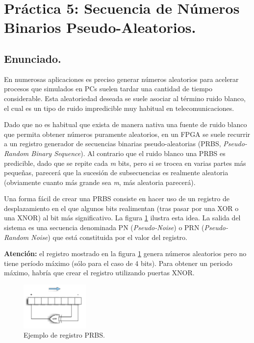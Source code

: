 \documentclass{article}
\begin{document}
\clearpage

\section{Práctica 5: Secuencia de Números Binarios Pseudo-Aleatorios.}

\subsection{Enunciado.}

En numerosas aplicaciones es preciso generar números aleatorios para acelerar procesos que simulados en PCs suelen tardar una cantidad de tiempo considerable. Esta aleatoriedad deseada se suele asociar al término ruido blanco, el cual es un tipo de ruido impredicible muy habitual en telecomunicaciones.

Dado que no es habitual que exista de manera nativa una fuente de ruido blanco que permita obtener números puramente aleatorios, en un FPGA se suele recurrir a un registro generador de secuencias binarias pseudo-aleatorias (PRBS, \textit{Pseudo-Random Binary Sequence}). Al contrario que el ruido blanco una PRBS es predicible, dado que se repite cada \emph{m} bits, pero si se trocea en varias partes más pequeñas, parecerá que la sucesión de subsecuencias es realmente aleatoria (obviamente cuanto más grande sea \emph{m}, más aleatoria parecerá).

Una forma fácil de crear una PRBS consiste en hacer uso de un registro de desplazamiento en el que algunos bits realimentan (tras pasar por una XOR o una XNOR) al bit más significativo. La figura \ref{fig:p5:prbs} ilustra esta idea. La salida del sistema es una secuencia denominada PN (\emph{Pseudo-Noise}) o PRN (\emph{Pseudo-Random Noise}) que está constituida por el valor del registro.

\textbf{Atención:} el registro mostrado en la figura \ref{fig:p5:prbs} genera números aleatorios pero no tiene período máximo (sólo para el caso de 4 bits). Para obtener un periodo máximo, habría que crear el registro utilizando puertas XNOR.

\begin{figure}[h]
  \centering
    \includegraphics[width=0.3\textwidth]{img/PRBS.pdf}
  \caption{Ejemplo de registro PRBS.}
  \label{fig:p5:prbs}
\end{figure}
\end{document}
